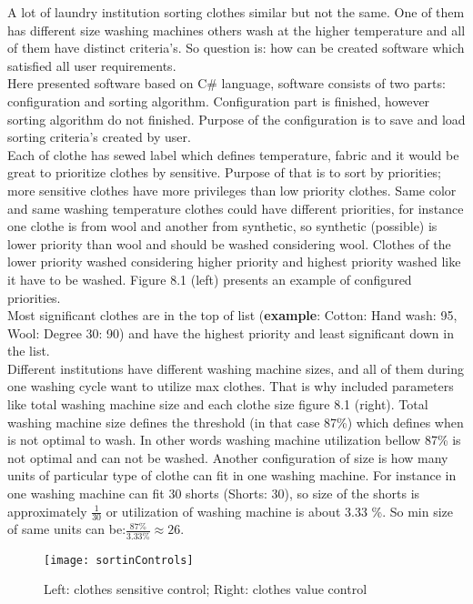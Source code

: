 A lot of laundry institution sorting clothes similar but not the same. One of them has different size washing machines others wash at the higher temperature and all of them have distinct criteria’s.   So question is: how can be created software which satisfied all user requirements. \\  Here presented software based on C\# language, software consists of two parts: configuration and sorting algorithm. Configuration part is finished, however sorting algorithm do not finished. Purpose of the configuration is to save and load sorting criteria’s created by user. 
\\
Each of clothe has sewed label which defines temperature, fabric and it would be great to prioritize clothes by sensitive. Purpose of that is to sort by priorities; more sensitive clothes have more privileges than low priority clothes. Same color and same washing temperature clothes could have different priorities, for instance one clothe is from wool and another from synthetic, so synthetic (possible) is lower priority than wool and should be washed considering wool. Clothes of the lower priority washed considering higher priority and highest priority washed like it have to be washed. Figure 8.1 (left) presents an example of configured priorities. \\ Most significant clothes are in the top of list (\textbf{example}: Cotton: Hand wash: 95, Wool: Degree 30: 90) and have the highest priority and least significant down in the list. 
\\
Different institutions have different washing machine sizes, and all of them during one washing cycle want to utilize max clothes. That is why included parameters like total washing machine size and each clothe size figure 8.1 (right). Total washing machine size defines the threshold (in that case 87\%) which defines when is not optimal to wash. In other words washing machine utilization bellow 87\% is not optimal and can not be washed. Another configuration of size is how many units of particular type of clothe can fit in one washing machine. For instance in one washing machine can fit 30 shorts (Shorts: 30), so size of the shorts is approximately $\frac{1}{30}$ or utilization of washing machine is about 3.33 \%. So min size of same units can be:$\frac{87\%}{3.33\%}\approx 26$. \\

\begin{figure}[h]
	\centering
		\texttt{[image: sortinControls]}
	\caption{Left: clothes sensitive control; Right: clothes value control}
	\label{fig:planning}
\end{figure}


